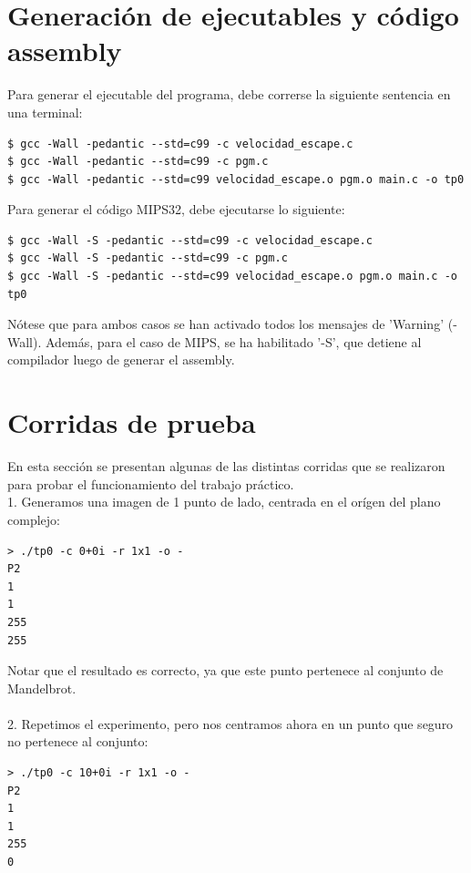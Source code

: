 \documentclass[a4paper,10pt]{article}
\begin{document}
\pagebreak



\section{Generaci\'on de ejecutables y c\'odigo assembly}
Para generar el ejecutable del programa, debe correrse la siguiente sentencia en una terminal:

\begin{verbatim}
$ gcc -Wall -pedantic --std=c99 -c velocidad_escape.c
$ gcc -Wall -pedantic --std=c99 -c pgm.c
$ gcc -Wall -pedantic --std=c99 velocidad_escape.o pgm.o main.c -o tp0
\end{verbatim}

Para generar el c\'odigo MIPS32, debe ejecutarse lo siguiente:
\begin{verbatim}
$ gcc -Wall -S -pedantic --std=c99 -c velocidad_escape.c
$ gcc -Wall -S -pedantic --std=c99 -c pgm.c
$ gcc -Wall -S -pedantic --std=c99 velocidad_escape.o pgm.o main.c -o tp0
\end{verbatim}

N\'otese que para ambos casos se han activado todos los mensajes de 'Warning' (-Wall). Adem\'as, para el caso de MIPS, se ha habilitado '-S', que detiene al compilador luego de generar el assembly.
\pagebreak




\section{Corridas de prueba}

En esta secci\'on se presentan algunas de las distintas corridas que se realizaron para probar el funcionamiento del trabajo pr\'actico.\\

1. Generamos una imagen de 1 punto de lado, centrada en el or\'igen del plano complejo:
\begin{verbatim}
> ./tp0 -c 0+0i -r 1x1 -o -
P2
1
1
255
255
\end{verbatim}

Notar que el resultado es correcto, ya que este punto pertenece al conjunto de Mandelbrot.\\
\\
2. Repetimos el experimento, pero nos centramos ahora en un punto que seguro no pertenece
al conjunto:
\begin{verbatim}
> ./tp0 -c 10+0i -r 1x1 -o -
P2
1
1
255
0
\end{verbatim}
\end{document}
